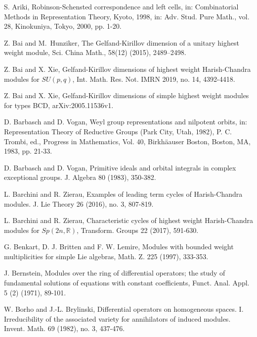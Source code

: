 \documentclass{amsart}[12pt]
\numberwithin{equation}{section}
\begin{document}
\begin{thebibliography}{99}

 S. Ariki, Robinson-Schensted correspondence and left cells, in: Combinatorial Methods in Representation Theory, Kyoto, 1998, in: Adv. Stud. Pure Math., vol. 28, Kinokuniya, Tokyo, 2000, pp. 1-20.


Z. Bai and M.~Hunziker,  The Gelfand-Kirillov dimension of a unitary highest weight  module,
 Sci. China Math., 58(12) (2015), 2489--2498.

Z. Bai and X. Xie, Gelfand-Kirillov dimensions of highest weight Harish-Chandra modules for $SU(p,q)$,  Int. Math. Res. Not. IMRN 2019, no. 14, 4392-4418.

Z. Bai and X. Xie, Gelfand-Kirillov dimensions of simple highest weight modules for types BCD,  arXiv:2005.11536v1.




D. Barbasch and D. Vogan, Weyl group representations and nilpotent orbits, in: Representation Theory of Reductive Groups (Park City, Utah, 1982), P. C. Trombi, ed., Progress in Mathematics, Vol. 40, Birkh\"{a}auser Boston, Boston, MA, 1983, pp. 21-33.

D. Barbasch and D. Vogan, Primitive ideals and orbital integrals in complex exceptional groups.
J. Algebra 80 (1983), 350-382.


L. Barchini and R. Zierau,
Examples of leading term cycles of Harish-Chandra modules. J. Lie Theory 26 (2016), no. 3, 807-819.

L. Barchini and R. Zierau, Characteristic cycles of highest weight Harish-Chandra modules for $Sp(2n, \mathbb{R})$, Transform. Groups 22 (2017),  591-630.


G. Benkart, D. J. Britten and F. W. Lemire,  Modules with bounded weight multiplicities for simple Lie algebras,  Math. Z. 225 (1997), 333-353.

J. Bernstein, Modules over the ring of differential operators; the study of fundamental solutions of equations with constant coefficients, Funct. Anal. Appl. 5 (2) (1971), 89-101.


 W. Borho and J.-L. Brylinski, Differential operators on homogeneous spaces. I. Irreducibility of the associated variety for annihilators of induced modules. Invent. Math. 69 (1982), no. 3, 437-476.


\end{thebibliography}
\end{document}
